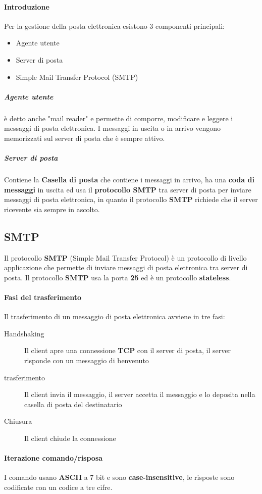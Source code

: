     \paragraph{Introduzione}
        Per la gestione della posta elettronica esistono 3 componenti principali:
        \begin{itemize}
            \item Agente utente
            \item Server di posta
            \item Simple Mail Transfer Protocol (SMTP)
        \end{itemize}
        \subparagraph{Agente utente} è detto anche "mail reader" e permette di comporre, modificare e leggere i messaggi di posta elettronica. I messaggi in uscita o in arrivo vengono memorizzati sul server di posta che è sempre attivo.
        \subparagraph{Server di posta} Contiene la \textbf{Casella di posta} che contiene i messaggi in arrivo, ha una \textbf{coda di messaggi} in uscita ed usa il \textbf{protocollo SMTP} tra server di posta per inviare messaggi di posta elettronica, in quanto il protocollo \textbf{SMTP} richiede che il server ricevente sia sempre in ascolto.
    \subsection{SMTP}
        Il protocollo \textbf{SMTP} (Simple Mail Transfer Protocol) è un protocollo di livello applicazione che permette di inviare messaggi di posta elettronica tra server di posta. Il protocollo \textbf{SMTP} usa la porta \textbf{25} ed è un protocollo \textbf{stateless}.
        \paragraph{Fasi del trasferimento} Il trasferimento di un messaggio di posta elettronica avviene in tre fasi:
            \begin{description}
                \item[Handshaking] Il client apre una connessione \textbf{TCP} con il server di posta, il server risponde con un messaggio di benvenuto
                \item[trasferimento] Il client invia il messaggio, il server accetta il messaggio e lo deposita nella casella di posta del destinatario
                \item[Chiusura] Il client chiude la connessione
            \end{description}
        \paragraph{Iterazione comando/risposa} I comando usano \textbf{ASCII} a 7 bit e sono \textbf{case-insensitive}, le risposte sono codificate con un codice a tre cifre.
